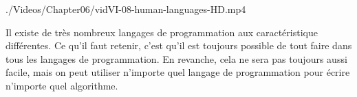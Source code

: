\begin{marginvideo}
		{./Videos/Chapter06/vidVI-08-human-languages-HD.mp4}%
\end{marginvideo}

Il existe de très nombreux langages de programmation aux caractéristique différentes. Ce qu'il faut retenir, c'est qu'il est toujours possible de tout faire dans tous les langages de programmation. En revanche, cela ne sera pas toujours aussi facile, mais on peut utiliser n'importe quel langage de programmation pour écrire n'importe quel algorithme. 

